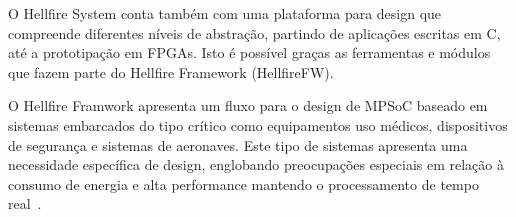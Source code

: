 O Hellfire System conta também com uma plataforma para design que compreende diferentes
níveis de abstração, partindo de aplicações escritas em C, até a prototipação em FPGAs.
Isto é possível graças as ferramentas e módulos que fazem parte do Hellfire Framework (HellfireFW).

O Hellfire Framwork apresenta um fluxo para o design de MPSoC baseado em sistemas embarcados do tipo crítico
como equipamentos uso médicos, dispositivos de segurança e sistemas de aeronaves. Este tipo de sistemas
apresenta uma necessidade específica de design, englobando preocupações especiais em relação à consumo de
energia e alta performance mantendo o processamento de tempo real~\cite{5450495}.
